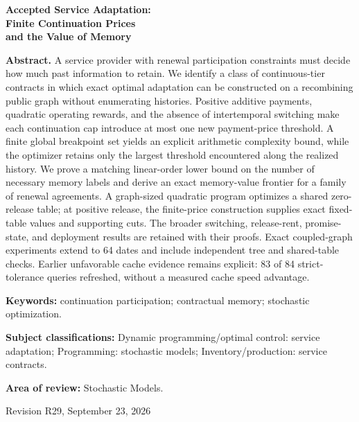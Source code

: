 \documentclass[11pt,letterpaper]{article}
\theoremstyle{definition}\newtheorem{assumption}[theorem]{Assumption}
\begin{document}
\begin{titlepage}\centering
{\Large\bfseries Accepted Service Adaptation:\\ Finite Continuation Prices\\ and the Value of Memory\par}
\vspace{.35in}{Anonymous manuscript for Operations Research\par}\vspace{.25in}
\begin{minipage}{\textwidth}
\textbf{Abstract.} A service provider with renewal participation constraints must decide how much past information to retain. We identify a class of continuous-tier contracts in which exact optimal adaptation can be constructed on a recombining public graph without enumerating histories. Positive additive payments, quadratic operating rewards, and the absence of intertemporal switching make each continuation cap introduce at most one new payment-price threshold. A finite global breakpoint set yields an explicit arithmetic complexity bound, while the optimizer retains only the largest threshold encountered along the realized history. We prove a matching linear-order lower bound on the number of necessary memory labels and derive an exact memory-value frontier for a family of renewal agreements. A graph-sized quadratic program optimizes a shared zero-release table; at positive release, the finite-price construction supplies exact fixed-table values and supporting cuts. The broader switching, release-rent, promise-state, and deployment results are retained with their proofs. Exact coupled-graph experiments extend to 64 dates and include independent tree and shared-table checks. Earlier unfavorable cache evidence remains explicit: 83 of 84 strict-tolerance queries refreshed, without a measured cache speed advantage.
\par\vspace{.15in}\textbf{Keywords:} continuation participation; contractual memory; stochastic optimization.
\par\vspace{.1in}\textbf{Subject classifications:} Dynamic programming/optimal control: service adaptation; Programming: stochastic models; Inventory/production: service contracts.
\par\vspace{.1in}\textbf{Area of review:} Stochastic Models.
\end{minipage}\vfill{Revision R29, September 23, 2026\par}
\end{titlepage}


\end{document}
